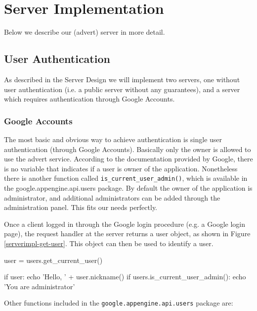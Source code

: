 \section{Server Implementation}
Below we describe our (advert) server in more detail.

\subsection{User Authentication}
As described in the Server Design we will implement two servers, one without user
authentication (i.e. a public server without any guarantees), and a server which
requires authentication through Google Accounts.

\subsubsection{Google Accounts}
The most basic and obvious way to achieve authentication is single user
authentication (through Google Accounts). Basically only the owner is allowed to
use the advert service. According to the documentation provided by Google, there
is no variable that indicates if a user is owner of the application. Nonetheless
there is another function called \texttt{is\_current\_user\_admin()}, which is
available in the google.appengine.api.users package. By default the owner of the
application is administrator, and additional administrators can be added through
the administration panel. This fits our needs perfectly.

Once a client logged in through the Google login procedure (e.g. a Google login
page), the request handler at the server returns a user object, as shown in
Figure \ref{serverimpl-get-user}. This object can then be used to identify a
user.

\begin{figure*}[ht] %
\begin{center}
\begin{code}
user = users.get_current_user()

if user:
  echo 'Hello, ' + user.nickname()
if users.is_current_user_admin():
  echo 'You are administrator'
\end{code}
\caption{Retrieving the user that's currently logged
in.\label{serverimpl-get-user}}
\end{center}
\end{figure*}

Other functions included in the \texttt{google.appengine.api.users} package are:

